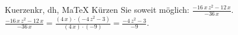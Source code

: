 \begin{MAufgabe}{Kuerzen}{kr, dh, MaTeX}
K\"urzen Sie soweit m\"oglich: $\frac{ - 16\, x\, z^2 - 12\, x}{- 36\, x}$.\\ 
\ifLsg\MLoesung
\quad $\frac{ - 16\, x\, z^2 - 12\, x}{- 36\, x}=\frac{(4\, x)\cdot( - 4\, z^2 - 3)}{(4\, x)\cdot(-9)}=\frac{ - 4\, z^2 - 3}{-9}$.\else\relax\fi
 \end{MAufgabe}
